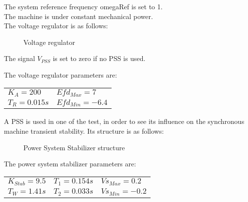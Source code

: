 \documentclass[a4paper, 12pt]{report}
\begin{document}
The system reference frequency omegaRef is set to 1.\\
The machine is under constant mechanical power. \\
The voltage regulator is as follows:
\begin{figure}[H]
\centering
{}
\caption{Voltage regulator}
\end{figure}

The signal $V_{PSS}$ is set to zero if no PSS is used.


The voltage regulator parameters are:
\begin{center}
\begin{tabular}{l|l}
   $K_A=200$ & $Efd_{Max}=7$  \\
   $T_R=0.015s$ & $Efd_{Min}=-6.4$   \\
\end{tabular}
\end{center}

A PSS is used in one of the test, in order to see its influence on the synchronous machine transient stability. Its structure is as follows:
\begin{figure}[H]
\centering
{}
\caption{Power System Stabilizer structure}
\end{figure}

The power system stabilizer parameters are:
\begin{center}
\begin{tabular}{l|l|l}
   $K_{Stab}=9.5$ & $T_1=0.154s$ & $Vs_{Max}=0.2$  \\
   $T_W=1.41s$ & $T_2=0.033s$ & $Vs_{Min}=-0.2$   \\
\end{tabular}
\end{center}
\end{document}
